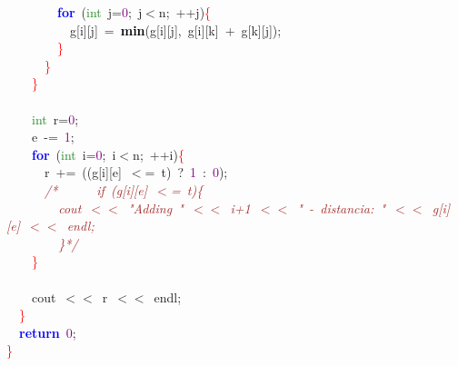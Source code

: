 \mbox{}\ \ \ \ \ \ \ \ \textbf{\textcolor{Blue}{for}}\ \textcolor{BrickRed}{(}\textcolor{ForestGreen}{int}\ j\textcolor{BrickRed}{=}\textcolor{Purple}{0}\textcolor{BrickRed}{;}\ j\textcolor{BrickRed}{$<$}n\textcolor{BrickRed}{;}\ \textcolor{BrickRed}{++}j\textcolor{BrickRed}{)}\textcolor{Red}{\{} \\
\mbox{}\ \ \ \ \ \ \ \ \ \ g\textcolor{BrickRed}{[}i\textcolor{BrickRed}{][}j\textcolor{BrickRed}{]}\ \textcolor{BrickRed}{=}\ \textbf{\textcolor{Black}{min}}\textcolor{BrickRed}{(}g\textcolor{BrickRed}{[}i\textcolor{BrickRed}{][}j\textcolor{BrickRed}{],}\ g\textcolor{BrickRed}{[}i\textcolor{BrickRed}{][}k\textcolor{BrickRed}{]}\ \textcolor{BrickRed}{+}\ g\textcolor{BrickRed}{[}k\textcolor{BrickRed}{][}j\textcolor{BrickRed}{]);} \\
\mbox{}\ \ \ \ \ \ \ \ \textcolor{Red}{\}} \\
\mbox{}\ \ \ \ \ \ \textcolor{Red}{\}} \\
\mbox{}\ \ \ \ \textcolor{Red}{\}} \\
\mbox{}\ \ \ \  \\
\mbox{}\ \ \ \ \textcolor{ForestGreen}{int}\ r\textcolor{BrickRed}{=}\textcolor{Purple}{0}\textcolor{BrickRed}{;} \\
\mbox{}\ \ \ \ e\ \textcolor{BrickRed}{-=}\ \textcolor{Purple}{1}\textcolor{BrickRed}{;} \\
\mbox{}\ \ \ \ \textbf{\textcolor{Blue}{for}}\ \textcolor{BrickRed}{(}\textcolor{ForestGreen}{int}\ i\textcolor{BrickRed}{=}\textcolor{Purple}{0}\textcolor{BrickRed}{;}\ i\textcolor{BrickRed}{$<$}n\textcolor{BrickRed}{;}\ \textcolor{BrickRed}{++}i\textcolor{BrickRed}{)}\textcolor{Red}{\{} \\
\mbox{}\ \ \ \ \ \ r\ \textcolor{BrickRed}{+=}\ \textcolor{BrickRed}{((}g\textcolor{BrickRed}{[}i\textcolor{BrickRed}{][}e\textcolor{BrickRed}{]}\ \textcolor{BrickRed}{$<$=}\ t\textcolor{BrickRed}{)}\ \textcolor{BrickRed}{?}\ \textcolor{Purple}{1}\ \textcolor{BrickRed}{:}\ \textcolor{Purple}{0}\textcolor{BrickRed}{);}\ \ \ \ \ \  \\
\mbox{}\ \ \ \ \ \ \textit{\textcolor{Brown}{/*\ \ \ \ \ \ if\ (g[i][e]\ $<$=\ t)\{}} \\
\mbox{}\textit{\textcolor{Brown}{\ \ \ \ \ \ \ \ cout\ $<$$<$\ "{}Adding\ "{}\ $<$$<$\ i+1\ $<$$<$\ "{}\ -\ distancia:\ "{}\ $<$$<$\ g[i][e]\ $<$$<$\ endl;}} \\
\mbox{}\textit{\textcolor{Brown}{\ \ \ \ \ \ \ \ \}*/}} \\
\mbox{}\ \ \ \ \textcolor{Red}{\}} \\
\mbox{} \\
\mbox{}\ \ \ \ cout\ \textcolor{BrickRed}{$<$$<$}\ r\ \textcolor{BrickRed}{$<$$<$}\ endl\textcolor{BrickRed}{;} \\
\mbox{}\ \ \textcolor{Red}{\}} \\
\mbox{}\ \ \textbf{\textcolor{Blue}{return}}\ \textcolor{Purple}{0}\textcolor{BrickRed}{;} \\
\mbox{}\textcolor{Red}{\}} \\

